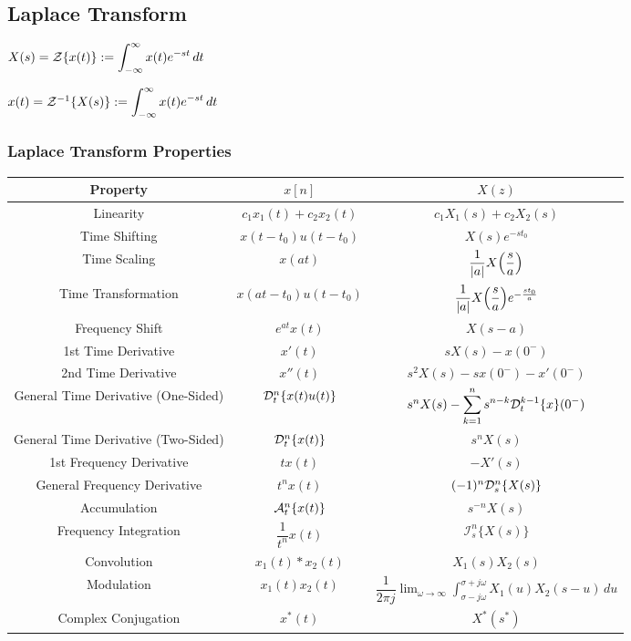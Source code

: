 \documentclass[11pt]{article}
\begin{document}
  \pagebreak

  \subsection{Laplace Transform}

  \begin{multicols}{2}
    \(X(s) = \mathcal{Z}\{x(t)\} := \displaystyle \int_{-\infty}^{\infty} x(t)e^{-st}\, dt\)

    \columnbreak

    \(x(t) = \mathcal{Z}^{-1}\{X(s)\} := \displaystyle \int_{-\infty}^{\infty} x(t)e^{-st}\, dt\)
  \end{multicols}

  \subsubsection{Laplace Transform Properties}

  \bgroup
  \renewcommand{\arraystretch}{1.8}
  \setlength{\tabcolsep}{0.2cm}
  \normalsize\begin{tabular}{c|c|c}
    Property & \(x[n]\) & \(X(z)\) \\
    \hline
    Linearity & \(c_1x_1(t) + c_2x_2(t)\) & \(c_1X_1(s) + c_2X_2(s)\) \\
    Time Shifting & \(x(t - t_0)u(t - t_0)\) & \(X(s)e^{-st_0}\) \\
    Time Scaling & \(x(at)\) & \(\dfrac{1}{|a|}X{\left( \dfrac{s}{a} \right)}\) \\
    Time Transformation & \(x(at - t_0)u(t - t_0)\) & \(\dfrac{1}{|a|}X{\left( \dfrac{s}{a} \right)}e^{-\frac{st_0}{a}}\) \\
    Frequency Shift & \(e^{at}x(t)\) & \(X(s - a)\) \\
    1st Time Derivative & \(x'(t)\) & \(sX(s) - x(0^-)\) \\
    2nd Time Derivative & \(x''(t)\) & \(s^2X(s) - sx(0^-) - x'(0^-)\) \\
    General Time Derivative (One-Sided) &
    \(\mathcal{D}_t^n\{x(t)u(t)\}\) & \(s^nX(s) - \displaystyle \sum_{k = 1}^{n} s^{n - k}\mathcal{D}_t^{k -1}\{x\}(0^-)\) \\
    General Time Derivative (Two-Sided) &
    \(\mathcal{D}_t^n\{x(t)\}\) & \(s^nX(s)\) \\
    1st Frequency Derivative & \(tx(t)\) & \(-X'(s)\) \\
    General Frequency Derivative & \(t^nx(t)\) & \((-1)^n\mathcal{D}^n_s\{X(s)\}\) \\
    Accumulation & \(\mathcal{A}^n_t\{x(t)\}\) & \(s^{-n}X(s)\) \\
    Frequency Integration & \(\dfrac{1}{t^n}x(t)\) & \(\mathcal{I}^n_{s}\{X(s)\}\) \\
    Convolution & \(x_1(t) * x_2(t)\) & \(X_1(s)X_2(s)\) \\
    Modulation & \(x_1(t)x_2(t)\) & \(\dfrac{1}{2\pi j}
    \displaystyle \lim_{\omega \to \infty}\int_{\sigma - j\omega}^{\sigma + j\omega} X_1(u)X_2(s - u)\,du\) \\
    Complex Conjugation & \(x^*(t)\) & \(X^*(s^*)\) \\
  \end{tabular}
\end{document}
